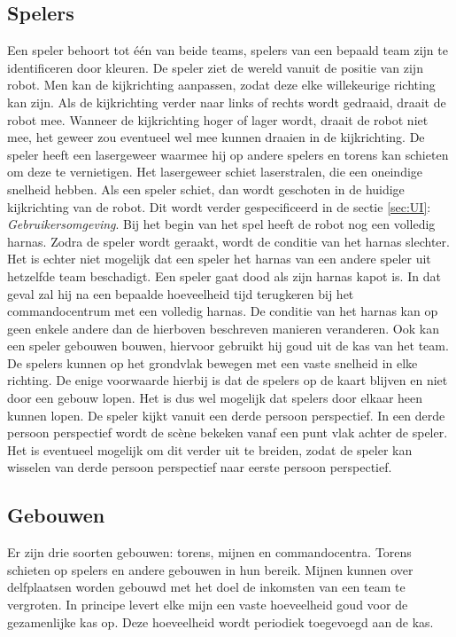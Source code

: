 \subsection{Spelers}
Een speler behoort tot \'e\'en van beide teams, spelers van een bepaald team zijn te identificeren door kleuren. De speler ziet de wereld vanuit de positie van zijn robot. Men kan de kijkrichting aanpassen, zodat deze elke willekeurige richting kan zijn. Als de kijkrichting verder naar links of rechts wordt gedraaid, draait de robot mee. Wanneer de kijkrichting hoger of lager wordt, draait de robot niet mee, het geweer zou eventueel wel mee kunnen draaien in de kijkrichting. De speler heeft een lasergeweer waarmee hij op andere spelers en torens kan schieten om deze te vernietigen. Het lasergeweer schiet laserstralen, die een oneindige snelheid hebben. Als een speler schiet, dan wordt geschoten in de huidige kijkrichting van de robot. Dit wordt verder gespecificeerd in de sectie \ref{sec:UI}: \emph{Gebruikersomgeving}. Bij het begin van het spel heeft de robot nog een volledig harnas. Zodra de speler wordt geraakt, wordt de conditie van het harnas slechter. Het is echter niet mogelijk dat een speler het harnas van een andere speler uit hetzelfde team beschadigt.
\FloatBarrier
Een speler gaat dood als zijn harnas kapot is. In dat geval zal hij na een bepaalde hoeveelheid tijd terugkeren bij het commandocentrum met een volledig harnas. De conditie van het harnas kan op geen enkele andere dan de hierboven beschreven manieren veranderen. Ook kan een speler gebouwen bouwen, hiervoor gebruikt hij goud uit de kas van het team. De spelers kunnen op het grondvlak bewegen met een vaste snelheid in elke richting. De enige voorwaarde hierbij is dat de spelers op de kaart blijven en niet door een gebouw lopen. Het is dus wel mogelijk dat spelers door elkaar heen kunnen lopen. De speler kijkt vanuit een derde persoon perspectief. In een derde persoon perspectief wordt de sc\`ene bekeken vanaf een punt vlak achter de speler.
Het is eventueel mogelijk om dit verder uit te breiden, zodat de speler kan wisselen van derde persoon perspectief naar eerste persoon perspectief.

\subsection{Gebouwen}
Er zijn drie soorten gebouwen: torens, mijnen en commandocentra. Torens schieten op spelers en andere gebouwen in hun bereik. Mijnen kunnen over delfplaatsen worden gebouwd met het doel de inkomsten van een team te vergroten. In principe levert elke mijn een vaste hoeveelheid goud voor de gezamenlijke kas op. Deze hoeveelheid wordt periodiek toegevoegd aan de kas.

